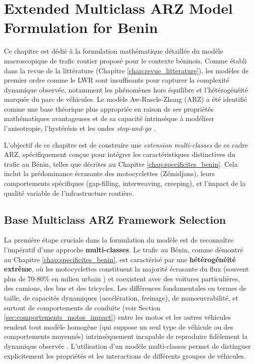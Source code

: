 
\chapter{Extended Multiclass ARZ Model Formulation for Benin}
\label{chap:formulation_modele}

Ce chapitre est dédié à la formulation mathématique détaillée du modèle macroscopique de trafic routier proposé pour le contexte béninois. Comme établi dans la revue de la littérature (Chapitre \ref{chap:revue_litterature}), les modèles de premier ordre comme le LWR sont insuffisants pour capturer la complexité dynamique observée, notamment les phénomènes hors équilibre et l'hétérogénéité marquée du parc de véhicules. Le modèle Aw-Rascle-Zhang (ARZ) \cite{AwKlarMaterneRascle2000, ZhangEtAl2003} a été identifié comme une base théorique plus appropriée en raison de ses propriétés mathématiques avantageuses et de sa capacité intrinsèque à modéliser l'anisotropie, l'hystérésis et les ondes \textit{stop-and-go} \cite{FanHertySeibold2014, yu2024traffic}.

L'objectif de ce chapitre est de construire une \textit{extension multi-classes} de ce cadre ARZ, spécifiquement conçue pour intégrer les caractéristiques distinctives du trafic au Bénin, telles que décrites au Chapitre \ref{chap:specificites_benin}. Cela inclut la prédominance écrasante des motocyclettes (Zémidjans), leurs comportements spécifiques (gap-filling, interweaving, creeping), et l'impact de la qualité variable de l'infrastructure routière.

\section{Base Multiclass ARZ Framework Selection}
\label{sec:base_multiclass_arz}

La première étape cruciale dans la formulation du modèle est de reconnaître l'impératif d'une approche \textbf{multi-classes}. Le trafic au Bénin, comme démontré au Chapitre \ref{chap:specificites_benin}, est caractérisé par une \textbf{hétérogénéité extrême}, où les motocyclettes constituent la majorité écrasante du flux (souvent plus de 70-80\% en milieu urbain \cite{Djossou_ZemidjanCotonou}) et coexistent avec des voitures particulières, des camions, des bus et des tricycles. Les différences fondamentales en termes de taille, de capacités dynamiques (accélération, freinage), de manœuvrabilité, et surtout de comportements de conduite (voir Section \ref{sec:comportements_motos_impact}) entre les motos et les autres véhicules rendent tout modèle homogène (qui suppose un seul type de véhicule ou des comportements moyennés) intrinsèquement incapable de reproduire fidèlement la dynamique observée \cite{WongWong2002}. L'utilisation d'un modèle multi-classes permet de distinguer explicitement les propriétés et les interactions de différents groupes de véhicules.

